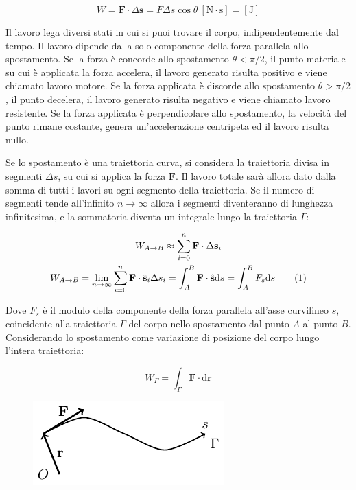\documentclass{article}
\newcommand{\vect}[1]{\boldsymbol{\mathbf{#1}}}
\newcommand{\df}{\mathrm{d}}
\numberwithin{equation}{subsection}
\begin{document}
\begin{equation}
    W=\vect{F}\cdot\Delta\vect{s}=F\Delta s\cos\theta\:\left[\mathrm{N}\cdot \mathrm{s}\right]=\left[\mathrm{J}\right]
\end{equation}

Il lavoro lega diversi stati in cui si puoi trovare il corpo, 
indipendentemente dal tempo. Il lavoro dipende 
dalla solo componente della forza parallela allo spostamento. 
Se la forza è concorde allo spostamento $\theta<{\pi}/{2}$, il punto materiale su cui è applicata la forza accelera, il lavoro generato risulta positivo e viene chiamato lavoro motore. Se la 
forza applicata è discorde allo spostamento $\theta>{\pi}/{2}$, il punto decelera, il lavoro generato risulta negativo e viene chiamato lavoro resistente. 
Se la forza applicata è perpendicolare allo spostamento, la velocità del punto rimane costante, genera un'accelerazione centripeta ed il lavoro risulta nullo. 



Se lo spostamento è una traiettoria curva, si considera la 
traiettoria divisa in segmenti $\Delta s$, su cui si 
applica la forza $\vect{F}$. Il lavoro totale sarà allora dato 
dalla somma di tutti i lavori su ogni segmento della 
traiettoria. Se il numero di segmenti tende all'infinito $n\to\infty$ 
allora i segmenti diventeranno di lunghezza infinitesima, e la 
sommatoria diventa un integrale lungo la traiettoria $\Gamma$:

\begin{gather*}
    \displaystyle W_{A\to B}\approx\sum_{i=0}^{n}\vect{F}\cdot\Delta\vect{s}_i\\
    W_{A\to B}=\lim_{n\to\infty}\sum_{i=0}^{n}\vect{F}\cdot\hat{\vect{s}}_i{\Delta s_i}=\int_{A}^{B}\vect{F}\cdot\hat{\vect{s}}\df s=\int_{A}^{B}F_s\df s\tag{\stepcounter{equation}\theequation}
\end{gather*}

Dove $F_s$ è il modulo della componente della forza parallela 
all'asse curvilineo $s$, coincidente alla traiettoria $\Gamma$ 
del corpo nello spostamento dal punto $A$ al punto $B$.
Considerando lo spostamento come variazione di posizione 
del corpo lungo l'intera traiettoria:

\begin{equation}
    \displaystyle W_{\Gamma}=\int_{\Gamma}\vect{F}\cdot \df\vect{r}
\end{equation}
\begin{figure}[H]%
    \centering
    \includegraphics{lavoro-1.pdf}%
\end{figure}
\end{document}
